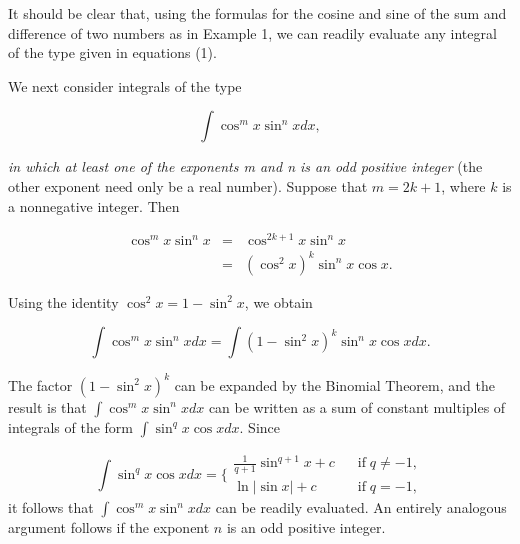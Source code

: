 It should be clear that, using the formulas for the cosine and sine of the sum and difference of two numbers as in Example 1, we can readily evaluate any integral of the type given in equations (1).
\medskip

We next consider integrals of the type


\begin{equation}
\int \cos^{m} x \sin^{n}x dx, 
\label{eq7.2.2}
\end{equation}

\noindent \textit{in which at least one of the exponents m and n is an odd positive integer} 
(the other exponent need only be a real number). Suppose that $m = 2k + 1$, 
where $k$ is a nonnegative integer. Then

\begin{eqnarray*}
\cos^{m} x \sin^{n} x &=& \cos^{2k+1}x \sin^{n}x\\
                                 &=& (\cos^{2}x)^{k} \sin^{n} x \cos x.
\end{eqnarray*} 

\noindent Using the identity $\cos^{2}x = 1 - \sin^{2}x$, we obtain

$$
\int \cos^{m}x \sin^{n}x dx = \int (1 - \sin^{2}x)^{k} \sin^{n}x \cos x dx.
$$

\noindent The factor $(1 - \sin^{2}x)^k$ can be expanded by the Binomial Theorem, 
and the result is that $\int \cos^{m}x \sin^{n}x dx$ can be written as a sum of constant multiples of integrals of the form $\int \sin^{q}x \cos x dx$. Since

$$
\int \sin^{q} x  \cos x dx = \{ \begin{array}{ll}
\frac{1}{q + 1} \sin ^{q + 1} x + c     & \;\;\; \mbox{if}\; q \neq -1,\\
\ln |\sin x| + c                                   & \;\;\; \mbox{if}\; q = - 1,
\end{array}
$$
\noindent it follows that $\int \cos^{m}x \sin^{n}x dx$ can be readily evaluated. 
An entirely analogous argument follows if the exponent $n$ is an odd positive integer.


